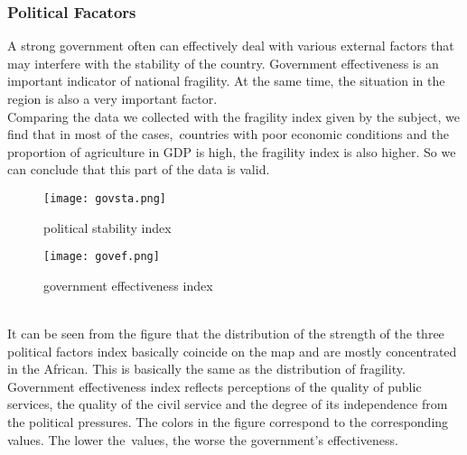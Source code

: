 \documentclass{mcmthesis}
\begin{document}
\subsubsection{Political Facators}
A strong government often can effectively deal with various external factors that may interfere with the stability of the country. Government effectiveness is an important indicator of national fragility. At the same time, the situation in the region is also a very important factor.\\
Comparing the data we collected with the fragility index given by the subject, we find that in most of the cases, countries with poor economic conditions and the proportion of agriculture in GDP is high, the fragility index is also higher. So we can conclude that this part of the data is valid.\\
\begin{figure}[h]
  \centering
  \begin{minipage}[h]{0.48\textwidth}
  \centering
  \texttt{[image: govsta.png]}
  \caption{political stability index}
  \end{minipage}
  \begin{minipage}[h]{0.48\textwidth}
  \centering
  \texttt{[image: govef.png]}
  \caption{government effectiveness index}
  \end{minipage}
\end{figure}\\
It can be seen from the figure that the distribution of the strength of the three political factors index basically coincide on the map and are mostly concentrated in the African. This is basically the same as the distribution of fragility. Government effectiveness index reflects perceptions of the quality of public services, the quality of the civil service and the degree of its independence from the political pressures. The colors in the figure correspond to the corresponding values. The lower the values, the worse the government’s effectiveness.
\end{document}
